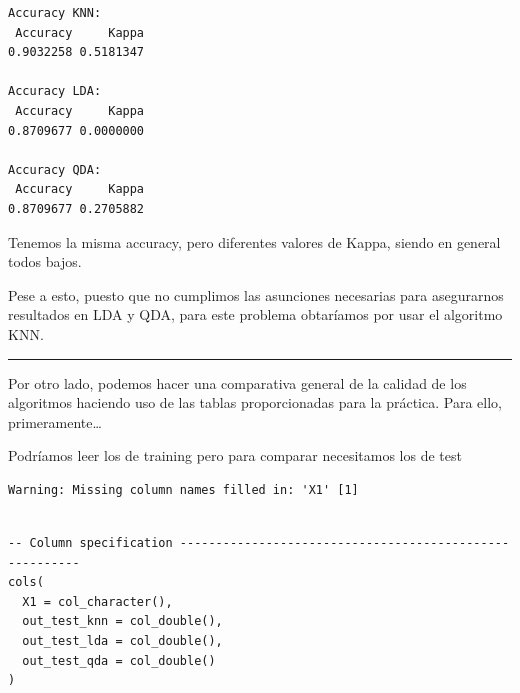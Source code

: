 \documentclass[
]{article}
\begin{document}
\begin{verbatim}
Accuracy KNN:
 Accuracy     Kappa 
0.9032258 0.5181347 

Accuracy LDA:
 Accuracy     Kappa 
0.8709677 0.0000000 

Accuracy QDA:
 Accuracy     Kappa 
0.8709677 0.2705882 
\end{verbatim}

Tenemos la misma accuracy, pero diferentes valores de Kappa, siendo en
general todos bajos.

Pese a esto, puesto que no cumplimos las asunciones necesarias para
asegurarnos resultados en LDA y QDA, para este problema obtaríamos por
usar el algoritmo KNN.

\begin{center}\rule{0.5\linewidth}{0.5pt}\end{center}

Por otro lado, podemos hacer una comparativa general de la calidad de
los algoritmos haciendo uso de las tablas proporcionadas para la
práctica. Para ello, primeramente\ldots{}

Podríamos leer los de training pero para comparar necesitamos los de
test

\begin{verbatim}
Warning: Missing column names filled in: 'X1' [1]
\end{verbatim}

\begin{verbatim}

-- Column specification --------------------------------------------------------
cols(
  X1 = col_character(),
  out_test_knn = col_double(),
  out_test_lda = col_double(),
  out_test_qda = col_double()
)
\end{verbatim}
\end{document}

